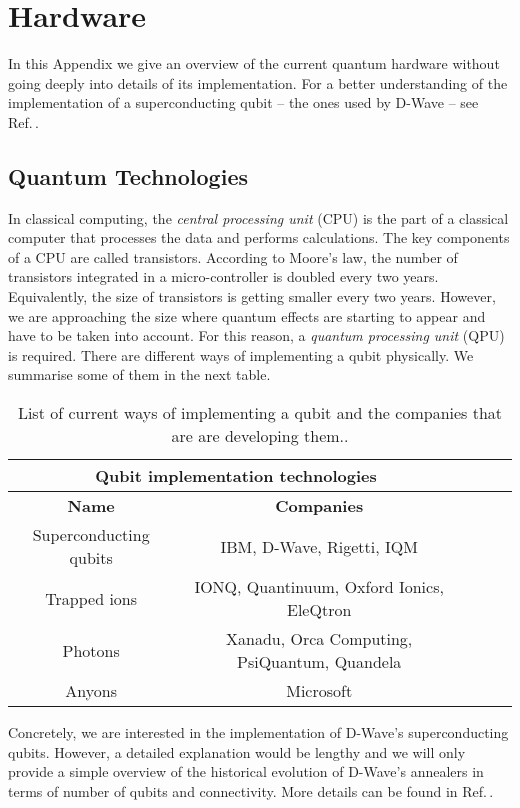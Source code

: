 
\chapter{Hardware} %
\label{AppendixC} %
In this Appendix we give an overview of the current quantum hardware without going deeply into details of its implementation. For a better understanding of the implementation of a superconducting qubit -- the ones used by D-Wave -- see Ref.\,\cite{AlvaroDiazComputacionAdiabatica}.
\section{Quantum Technologies}
In classical computing, the \textit{central processing unit} (CPU) is the part of a classical computer that processes the data and performs calculations. The key components of a CPU are called transistors. According to Moore's law, the number of transistors integrated in a micro-controller is doubled every two years. Equivalently, the size of transistors is getting smaller every two years. However, we are approaching the size where quantum effects are starting to appear and have to be taken into account. For this reason, a \textit{quantum processing unit} (QPU) is required. There are different ways of implementing a qubit physically. We summarise some of them in the next table.
\begin{table}[H]
\centering
\begin{tabular}{ |c|c|c|c|c|  }
 \hline
 \multicolumn{2}{|c|}{\textbf{Qubit implementation technologies}} \\
 \hline
 \textbf{Name} & \textbf{Companies}  \\
 \hline
Superconducting qubits         & IBM, D-Wave, Rigetti, IQM \\
 \hline
Trapped ions         & IONQ, Quantinuum, Oxford Ionics, EleQtron \\
 \hline
Photons     & Xanadu, Orca Computing, PsiQuantum, Quandela \\
 \hline
Anyons      & Microsoft \\
 \hline
\end{tabular}
\caption{List of current ways of implementing a qubit and the companies that are are developing them..}
\label{tab:QubitTechnologies}
\end{table}
Concretely, we are interested in the implementation of D-Wave's superconducting qubits. However, a detailed explanation would be lengthy and we will only provide a simple overview of the historical evolution of D-Wave's annealers in terms of number of qubits and connectivity. More details can be found in Ref.\,\cite{AlvaroDiazComputacionAdiabatica}. \\\\
